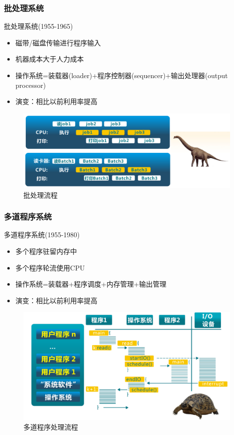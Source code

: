 \documentclass[UTF8]{ctexbeamer}
\begin{document}
\begin{frame}
	
	\frametitle{批处理系统}
	
	批处理系统(1955-1965)
	\begin{itemize}
		\item 磁带/磁盘传输进行程序输入
		\item 机器成本大于人力成本	
		\item 操作系统=装载器(loader)+程序控制器(sequencer)+输出处理器(output processor)
		\item 演变：相比以前利用率提高
	\end{itemize}
	
	\begin{figure}
		\centering
		\includegraphics[width=0.8\linewidth]{history-batch-process-graph}
		\caption{批处理流程}
	\end{figure}
	
\end{frame}




\begin{frame}
	
	\frametitle{多道程序系统}
	
	多道程序系统(1955-1980)
	\begin{itemize}
		\item 多个程序驻留内存中
		\item 多个程序轮流使用CPU	
		\item 操作系统=装载器+程序调度+内存管理+输出管理
		\item 演变：相比以前利用率提高
	\end{itemize}
	
	\begin{figure}
		\centering
		\includegraphics[width=0.8\linewidth]{history-multiprogramming}
		\caption{多道程序处理流程}
	\end{figure}
	
\end{frame}
\end{document}
